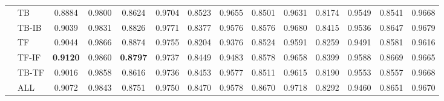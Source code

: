 \begin{table*}[t]
\begin{tabulary}{\textwidth}{CLCCCCCCCCCCCC}
      & TB & 0.8884 & 0.9800 & 0.8624 & 0.9704 & 0.8523 & 0.9655 & 0.8501 & 0.9631 & 0.8174 & 0.9549 & 0.8541 & 0.9668 \\
      & TB-IB & 0.9039 & 0.9831 & 0.8826 & 0.9771 & 0.8377 & 0.9576 & 0.8576 & 0.9680 & 0.8415 & 0.9536 & 0.8647 & 0.9679 \\
      & TF & 0.9044 & 0.9866 & 0.8874 & 0.9755 & 0.8204 & 0.9376 & 0.8524 & 0.9591 & 0.8259 & 0.9491 & 0.8581 & 0.9616 \\
      & TF-IF & \textbf{0.9120} & 0.9860 & \textbf{0.8797} & 0.9737 & 0.8449 & 0.9483 & 0.8578 & 0.9658 & 0.8399 & 0.9588 & 0.8669 & 0.9665 \\
      & TB-TF & 0.9016 & 0.9858 & 0.8616 & 0.9736 & 0.8453 & 0.9577 & 0.8511 & 0.9615 & 0.8190 & 0.9553 & 0.8557 & 0.9668 \\
      & ALL & 0.9072 & 0.9843 & 0.8751 & 0.9750 & 0.8470 & 0.9578 & 0.8670 & 0.9718 & 0.8292 & 0.9460 & 0.8651 & 0.9670 \\
    \bottomrule
    \end{tabulary}
  \end{table*}



